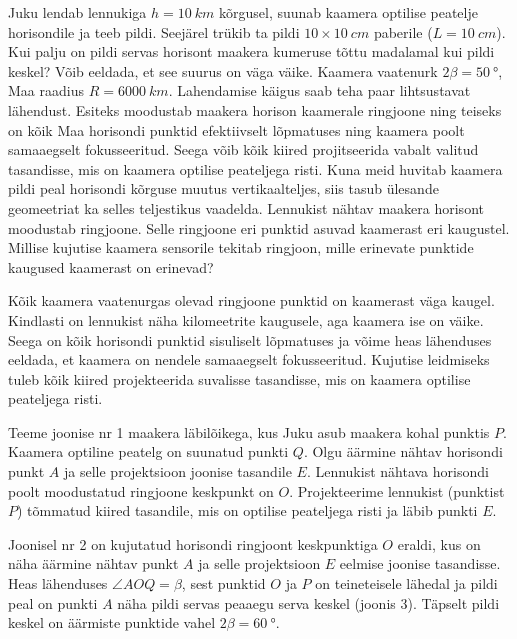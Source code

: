
Juku lendab lennukiga $h=\SI{10}{km}$ kõrgusel, suunab kaamera optilise peatelje horisondile ja teeb pildi. Seejärel trükib ta pildi $10\times \SI{10}{cm}$ paberile ($L=\SI{10}{cm}$). Kui palju on pildi servas horisont maakera kumeruse tõttu madalamal kui pildi keskel? Võib eeldada, et see suurus on väga väike. Kaamera vaatenurk $2\beta=\SI{50}{\degree}$, Maa raadius $R=\SI{6000}{km}$.\hint
Lahendamise käigus saab teha paar lihtsustavat lähendust. Esiteks moodustab maakera horison kaamerale ringjoone ning teiseks on kõik Maa horisondi punktid efektiivselt lõpmatuses ning kaamera poolt samaaegselt fokusseeritud. Seega võib kõik kiired projitseerida vabalt valitud tasandisse, mis on kaamera optilise peateljega risti. Kuna meid huvitab kaamera pildi peal horisondi kõrguse muutus vertikaalteljes, siis tasub ülesande geomeetriat ka selles teljestikus vaadelda.\solu
Lennukist nähtav maakera horisont moodustab ringjoone. Selle ringjoone eri punktid asuvad kaamerast eri kaugustel. Millise kujutise kaamera sensorile tekitab ringjoon, mille erinevate punktide kaugused kaamerast on erinevad?

Kõik kaamera vaatenurgas olevad ringjoone punktid on kaamerast väga kaugel. Kindlasti on lennukist näha kilomeetrite kaugusele, aga kaamera ise on väike. Seega on kõik horisondi punktid sisuliselt lõpmatuses ja võime heas lähenduses eeldada, et kaamera on nendele samaaegselt fokusseeritud. Kujutise leidmiseks tuleb kõik kiired projekteerida suvalisse tasandisse, mis on kaamera optilise peateljega risti.

Teeme joonise nr 1 maakera läbilõikega, kus Juku asub maakera kohal punktis $P$. Kaamera optiline peatelg on suunatud punkti $Q$. Olgu äärmine nähtav horisondi punkt $A$ ja selle projektsioon joonise tasandile $E$. Lennukist nähtava horisondi poolt moodustatud ringjoone keskpunkt on $O$. Projekteerime lennukist (punktist $P$) tõmmatud kiired tasandile, mis on optilise peateljega risti ja läbib punkti $E$.

Joonisel nr 2 on kujutatud horisondi ringjoont keskpunktiga $O$ eraldi, kus on näha äärmine nähtav punkt $A$ ja selle projektsioon $E$ eelmise joonise tasandisse. Heas lähenduses $\angle AOQ = \beta$, sest punktid $O$ ja $P$ on teineteisele lähedal ja pildi peal on punkti $A$ näha pildi servas peaaegu serva keskel (joonis 3). Täpselt pildi keskel on äärmiste punktide vahel $2\beta = \SI{60}{\degree}$.

